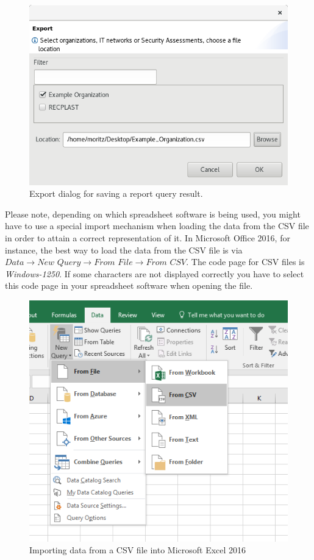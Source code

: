 \documentclass[a4paper,10pt]{book}
\begin{document}
\begin{figure}[htb!]
  \centering
  \includegraphics[width=\linewidth]{Screenshot/query-editor-export-dialog-en.png}
  \caption{Export dialog for saving a report query result.}
  \label{fig:export-dialog-for-saving-a-report-query-result}
\end{figure}

Please note, depending on which spreadsheet software is being used, you might
have to use a special import mechanism when loading the data from the CSV file
in order to attain a correct representation of it. In Microsoft Office 2016, for
instance, the best way to load the data from the CSV file is via
$\textit{Data}\to\textit{New Query}\to\textit{From File}\to\textit{From CSV}$.
The code page for CSV files is \textit{Windows-1250}. If some characters are not
displayed correctly you have to select this code page in your spreadsheet software
when opening the file.

\begin{figure}[htb!]
  \centering
  \includegraphics[width=\linewidth]{Screenshot/import-csv-microsoft-office-2016-en.png}
  \caption{Importing data from a CSV file into Microsoft Excel 2016}
  \label{fig:importing-data-from-a-csv-file-into-microsoft-excel-2016}
\end{figure}
\end{document}
